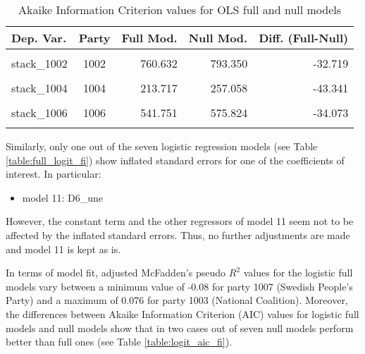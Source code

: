\documentclass[
]{article}
\providecommand{\tightlist}{%
  \setlength{\itemsep}{0pt}\setlength{\parskip}{0pt}}
\begin{document}
\begin{table}[!h]

\caption{\label{tab:unnamed-chunk-63}Akaike Information Criterion values for OLS full and null models 
        \label{table:ols_aic_fi}}
\centering
\begin{tabular}[t]{lcrrr}
\toprule
Dep. Var. & Party & Full Mod. & Null Mod. & Diff. (Full-Null)\\
\midrule
\cellcolor{gray!6}{stack\_1001} & \cellcolor{gray!6}{1001} & \cellcolor{gray!6}{503.822} & \cellcolor{gray!6}{524.434} & \cellcolor{gray!6}{-20.611}\\
stack\_1002 & 1002 & 760.632 & 793.350 & -32.719\\
\cellcolor{gray!6}{stack\_1003} & \cellcolor{gray!6}{1003} & \cellcolor{gray!6}{455.497} & \cellcolor{gray!6}{567.635} & \cellcolor{gray!6}{-112.137}\\
stack\_1004 & 1004 & 213.717 & 257.058 & -43.341\\
\cellcolor{gray!6}{stack\_1005} & \cellcolor{gray!6}{1005} & \cellcolor{gray!6}{579.991} & \cellcolor{gray!6}{634.977} & \cellcolor{gray!6}{-54.986}\\
\addlinespace
stack\_1006 & 1006 & 541.751 & 575.824 & -34.073\\
\cellcolor{gray!6}{stack\_1007} & \cellcolor{gray!6}{1007} & \cellcolor{gray!6}{185.984} & \cellcolor{gray!6}{217.272} & \cellcolor{gray!6}{-31.288}\\
\bottomrule
\end{tabular}
\end{table}

Similarly, only one out of the seven logistic regression models (see Table \ref{table:full_logit_fi}) show
inflated standard errors for one of the coefficients of interest. In particular:

\begin{itemize}
\tightlist
\item
  model 11: D6\_une
\end{itemize}

However, the constant term and the other regressors of model 11 seem not to be affected by the inflated standard errors. Thus, no further adjustments are made and model 11 is kept as is.

In terms of model fit, adjusted McFadden's pseudo \(R^2\) values for the logistic full models vary between
a minimum value of
-0.08
for party 1007
(Swedish People's Party)
and a maximum of
0.076
for party 1003
(National Coalition).
Moreover, the differences between Akaike Information Criterion (AIC) values for logistic full models and
null models show that in two cases out of seven null models perform better than full ones (see Table \ref{table:logit_aic_fi}).
\end{document}

